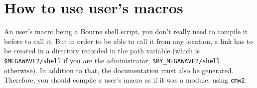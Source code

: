 \section{How to use user's macros}
\label{usermacros_howto}

An user's macro being a Bourne shell script, you don't really need to compile 
it before to call it. But in order to be able to call it from any location,
a link has to be created in a directory recorded in the path variable
(which is \verb+$MEGAWAVE2/shell+ if you are the administrator,
\verb+$MY_MEGAWAVE2/shell+ otherwise). In addition to that, the documentation 
must also be generated. Therefore, you should compile a user's macro as
if it was a module, using \verb+cmw2+.




